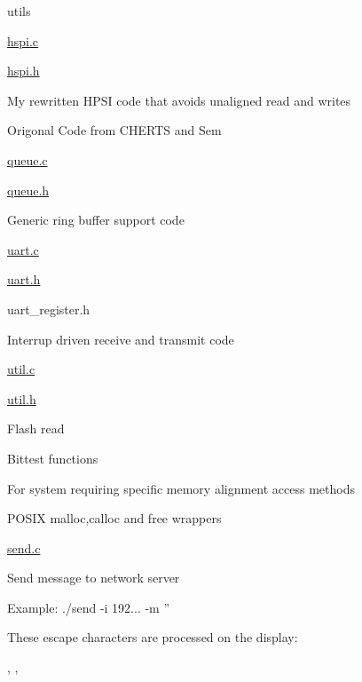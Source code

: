 utils
\begin{DoxyItemize}
\item \hyperlink{hspi_8c}{hspi.\-c}
\item \hyperlink{hspi_8h}{hspi.\-h}
\begin{DoxyItemize}
\item My rewritten H\-P\-S\-I code that avoids unaligned read and writes
\item Origonal Code from C\-H\-E\-R\-T\-S and Sem
\end{DoxyItemize}
\item \hyperlink{queue_8c}{queue.\-c}
\item \hyperlink{queue_8h}{queue.\-h}
\begin{DoxyItemize}
\item Generic ring buffer support code
\end{DoxyItemize}
\item \hyperlink{uart_8c}{uart.\-c}
\item \hyperlink{uart_8h}{uart.\-h}
\item uart\-\_\-register.\-h
\begin{DoxyItemize}
\item Interrup driven receive and transmit code
\end{DoxyItemize}
\item \hyperlink{util_8c}{util.\-c}
\item \hyperlink{util_8h}{util.\-h}
\begin{DoxyItemize}
\item Flash read
\item Bittest functions
\begin{DoxyItemize}
\item For system requiring specific memory alignment access methods
\end{DoxyItemize}
\item P\-O\-S\-I\-X malloc,calloc and free wrappers
\end{DoxyItemize}
\end{DoxyItemize}

\hyperlink{send_8c}{send.\-c}
\begin{DoxyItemize}
\item Send message to network server
\item Example\-: ./send -\/i 192... -\/m ''
\begin{DoxyItemize}
\item These escape characters are processed on the display\-: \par
, , 
\end{DoxyItemize}
\end{DoxyItemize}

